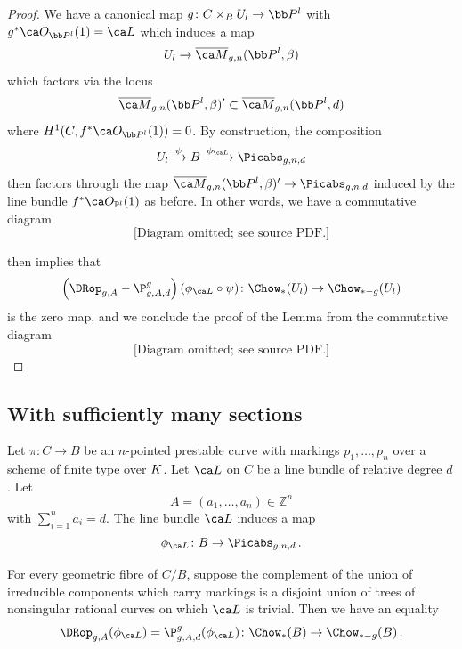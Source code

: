 \begin{proof}
We have a canonical map $g\colon C \times_B U_l \to \bb P^l$ with
$g^*\ca O_{\bb P^l}(1) = \ca L$
which induces a map $$U_l \to \Mbar_{g,n}(\bb P^l,\beta)$$ which factors via the locus $$\Mbar_{g,n}(\bb P^l, \beta)' \subset \Mbar_{g,n}(\bb P^l, d)$$
where $H^1(C, f^*\ca O_{\bb P^l}(1)) = 0$.
By construction, the composition $$U_l \xrightarrow{\psi} B \xrightarrow{\phi_{\ca L}} \Picabs_{g,n,d}$$ then factors through the map $ \Mbar_{g,n}(\bb P^l, \beta)' \to \Picabs_{g,n,d}$ induced by the line bundle $f^*\ca O_{\mathbb{P}^l}(1)$ as before. In other words, we have a commutative diagram
\[
\text{[Diagram omitted; see source PDF.]}
\]


 then implies that
\begin{equation}
\left(\DRop_{g,A}-\P_{g,A,d}^g \right)(\phi_{\ca L}\circ \psi)\colon \Chow_*(U_l) \to \Chow_{* - g}(U_l)
\end{equation}
is the zero map, and we conclude the proof of the Lemma from the commutative diagram
\begin{equation}
 \text{[Diagram omitted; see source PDF.]}
\end{equation}

\end{proof}



\subsection{With sufficiently many sections}\label{sec:many_markings}

Let $\pi\colon C\to B$ be an $n$-pointed prestable curve
with markings $p_1,\ldots, p_n$
over a scheme of finite type over ${K}$. Let
$\ca L$ on $C$ be a line bundle
of relative degree $d$.
Let $$A = (a_1,\ldots, a_n) \in\mathbb{Z}^n$$ with $\sum_{i=1}^n a_i = d$.
The line bundle $\ca L$ induces a map
$$\phi_{\ca L} \colon B \to \Picabs_{g,n,d}\, .$$



\begin{lemma}
\notready\label{lem:many_markings}
For every geometric fibre of $C/B$, suppose the
complement of the union of irreducible components which carry markings
is a disjoint union of trees of nonsingular
rational curves on which $\ca L$ is trivial. Then we have an equality
\begin{equation}\DRop_{g,A}(\phi_{\ca L})=
\P_{g,A,d}^g(\phi_{\ca L}) \colon \Chow_*(B) \to \Chow_{*-g}(B)\, .
\end{equation}
\end{lemma}

